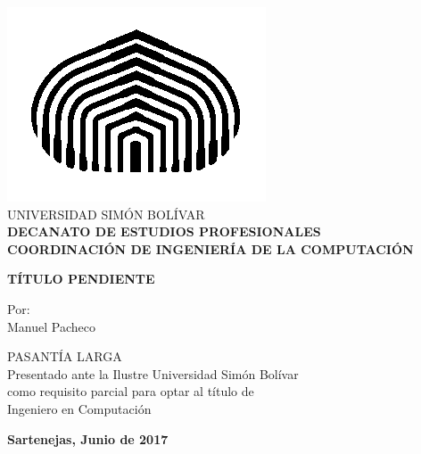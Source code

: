 
\begin{titlepage}
\begin{center}

\includegraphics[scale=0.5,type=png,ext=.png,read=.png]{figures/usb-logo} \\

\textsc {\large UNIVERSIDAD SIMÓN BOLÍVAR} \\
\textsc{\bfseries DECANATO DE ESTUDIOS PROFESIONALES\\
COORDINACIÓN DE INGENIERÍA DE LA COMPUTACIÓN}

\bigskip
\bigskip
\bigskip
\bigskip
\bigskip
\bigskip
\bigskip
\bigskip
\bigskip
\bigskip
\bigskip
\bigskip
\bigskip
\bigskip
\bigskip
\bigskip

\textsc{\bfseries TÍTULO PENDIENTE} %

\bigskip
\bigskip
\bigskip
\bigskip
\bigskip
\bigskip
\bigskip

\begin{minipage}{\textwidth}
\centering
Por: \\
Manuel Pacheco \\


\end{minipage}

\bigskip
\bigskip
\bigskip
\bigskip
\bigskip
\bigskip
\bigskip
\bigskip
\bigskip

{PASANTÍA LARGA \\ Presentado ante la Ilustre Universidad Simón Bolívar \\
como requisito parcial para optar al título de \\ Ingeniero en Computación} \\

\bigskip
\bigskip
\vfill

{\large \bfseries Sartenejas, Junio de 2017}

\end{center}
\end{titlepage}
